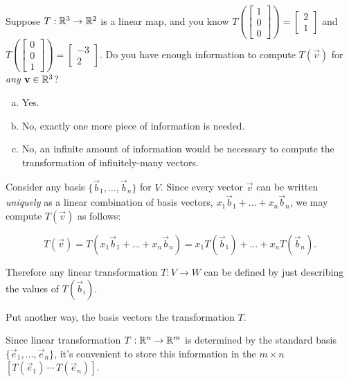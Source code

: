 \begin{applicationActivities}
\begin{activity}{5}
Suppose \(T: \mathbb{R}^3 \rightarrow \mathbb{R}^2\) is a linear map, and you know
\(
  T\left(\begin{bmatrix} 1 \\ 0 \\ 0 \end{bmatrix} \right)
=
  \begin{bmatrix} 2 \\ 1 \end{bmatrix}
\)
and
\(
  T\left(\begin{bmatrix} 0 \\ 0 \\ 1 \end{bmatrix} \right)
=
  \begin{bmatrix} -3 \\ 2 \end{bmatrix}
\).
Do you have enough information to compute
\(T(\vec{v})\) for \textit{any} \(\mathbf v\in\mathbb{R}^3\)?
\begin{enumerate}[(a)]
\item Yes.
\item No, exactly one more piece of information is needed.
\item No, an infinite amount of information would be necessary to compute
      the transformation of infinitely-many vectors.
\end{enumerate}
\end{activity}

\begin{fact}
Consider any basis \(\{\vec b_1,\dots,\vec b_n\}\) for $V$.  Since every
vector \(\vec v\) can be written \textit{uniquely} as a linear combination of
basis vectors, \(x_1\vec b_1+\dots+ x_n\vec b_n\), we may compute
\(T(\vec v)\) as follows:

\[
  T(\vec v)=T(x_1\vec b_1+\dots+ x_n\vec b_n)=
  x_1T(\vec b_1)+\dots+x_nT(\vec b_n)
.\]

Therefore any linear transformation \(T:V \rightarrow W\) can be defined
by just describing the values of \(T(\vec b_i)\).

Put another way, the basis vectors  the transformation \(T\).
\end{fact}

\begin{definition}
Since linear transformation \(T:\mathbb{R}^n\to\mathbb{R}^m\) is determined by
the standard basis \(\{\vec e_1,\dots,\vec e_n\}\), it's convenient to
store this information in the \(m\times n\) 
\([T(\vec e_1) \,\cdots\, T(\vec e_n)]\).


\end{definition}
\end{applicationActivities}

